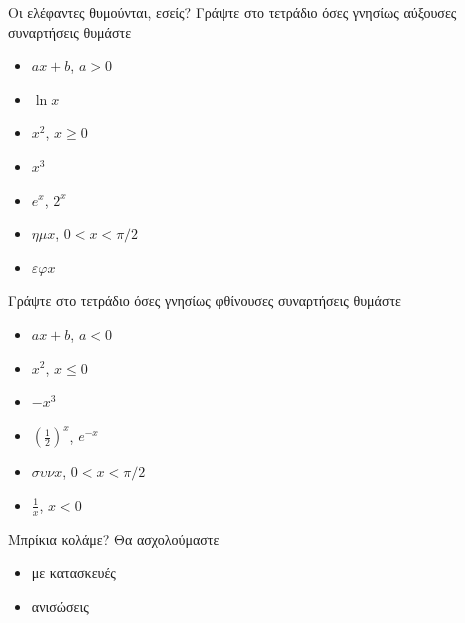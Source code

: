\documentclass[greek]{beamer}
\begin{document}
\begin{frame}{Οι ελέφαντες θυμούνται, εσείς?}
      Γράψτε στο τετράδιο όσες γνησίως αύξουσες συναρτήσεις θυμάστε \pause
      \begin{multicols}{2}
            \begin{itemize}
                  \item $ax+b$, $a>0$
                  \item $\ln x$
                  \item $x^2$, $x\ge 0$
                  \item $x^3$
                  \item $e^x$, $2^x$
                  \item $ημ x$, $0< x< \pi/2$
                  \item $εφ x$
            \end{itemize} \pause
      \end{multicols}

      Γράψτε στο τετράδιο όσες γνησίως φθίνουσες συναρτήσεις θυμάστε \pause
      \begin{multicols}{2}
            \begin{itemize}
                  \item $ax+b$, $a<0$
                  \item $x^2$, $x\le 0$
                  \item $-x^3$
                  \item $\left(\frac{1}{2}\right)^x$, $e^{-x}$
                  \item $συν x$, $0< x< \pi/2$
                  \item $\frac{1}{x}$, $x<0$
            \end{itemize}
      \end{multicols}
\end{frame}

\begin{frame}{Μπρίκια κολάμε?}
      Θα ασχολούμαστε
      \begin{itemize}
            \item με κατασκευές
            \item ανισώσεις
      \end{itemize}
\end{frame}
\end{document}
